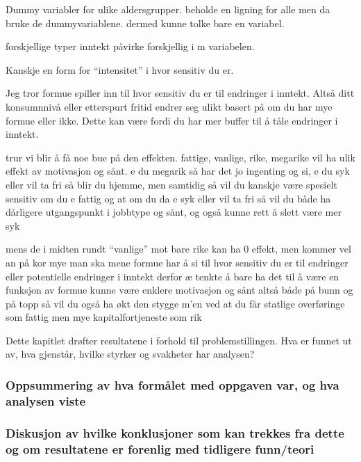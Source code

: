 \documentclass[
  12pt,
  a4paper,
  DIV=11,
  numbers=noendperiod]{scrartcl}
\begin{document}
Dummy variabler for ulike aldersgrupper. beholde en ligning for alle men
da bruke de dummyvariablene. dermed kunne tolke bare en variabel.

forskjellige typer inntekt påvirke forskjellig i m variabelen.

Kanskje en form for ``intensitet'' i hvor sensitiv du er.

Jeg tror formue spiller inn til hvor sensitiv du er til endringer i
inntekt. Altså ditt konsumnnivå eller etterspurt fritid endrer seg ulikt
basert på om du har mye formue eller ikke. Dette kan være fordi du har
mer buffer til å tåle endringer i inntekt.

trur vi blir å få noe bue på den effekten. fattige, vanlige, rike,
megarike vil ha ulik effekt av motivasjon og sånt. e du megarik så har
det jo ingenting og si, e du syk eller vil ta fri så blir du hjemme, men
samtidig så vil du kanskje være spesielt sensitiv om du e fattig og at
om du da e syk eller vil ta fri så vil du både ha dårligere utgangspunkt
i jobbtype og sånt, og også kunne rett å slett være mer syk

mens de i midten rundt ``vanlige'' mot bare rike kan ha 0 effekt, men
kommer vel an på kor mye man ska mene formue har å si til hvor sensitiv
du er til endringer eller potentielle endringer i inntekt derfor æ
tenkte å bare ha det til å være en funksjon av formue kunne være enklere
motivasjon og sånt altså både på bunn og på topp så vil du også ha økt
den stygge m'en ved at du får statlige overføringe som fattig men mye
kapitalfortjeneste som rik

Dette kapitlet drøfter resultatene i forhold til problemstillingen. Hva
er funnet ut av, hva gjenstår, hvilke styrker og svakheter har analysen?

\subsubsection{Oppsummering av hva formålet med oppgaven var, og hva
analysen
viste}\label{oppsummering-av-hva-formuxe5let-med-oppgaven-var-og-hva-analysen-viste}

\subsubsection{Diskusjon av hvilke konklusjoner som kan trekkes fra
dette og om resultatene er forenlig med tidligere
funn/teori}\label{diskusjon-av-hvilke-konklusjoner-som-kan-trekkes-fra-dette-og-om-resultatene-er-forenlig-med-tidligere-funnteori}
\end{document}

